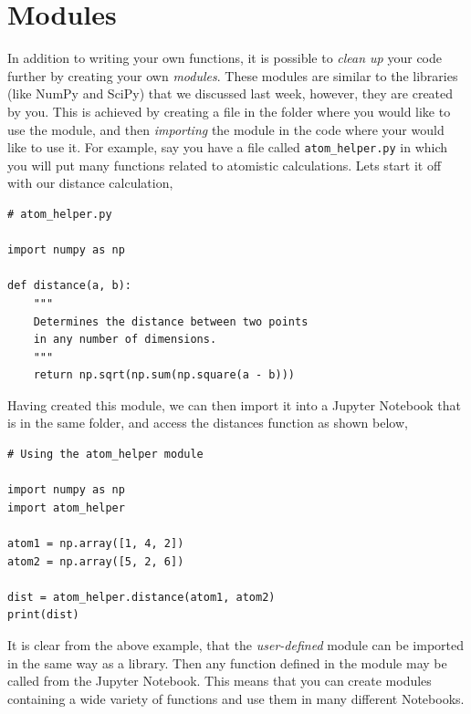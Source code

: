 \documentclass[a4paper]{article}
\begin{document}
\vspace{\baselineskip}
\begin{center}
	\noindent{}
\end{center}

\section{Modules}

In addition to writing your own functions, it is possible to \emph{clean up} your code further by creating your own \emph{modules}.
These modules are similar to the libraries (like NumPy and SciPy) that we discussed last week, however, they are created by you.
This is achieved by creating a file in the folder where you would like to use the module, and then \emph{importing} the module in the code where your would like to use it.
For example, say you have a file called \texttt{atom\_helper.py} in which you will put many functions related to atomistic calculations.
Lets start it off with our distance calculation,
\begin{lstlisting}
# atom_helper.py

import numpy as np

def distance(a, b):
    """
    Determines the distance between two points
    in any number of dimensions.
    """
    return np.sqrt(np.sum(np.square(a - b)))
\end{lstlisting}
Having created this module, we can then import it into a Jupyter Notebook that is in the same folder, and access the distances function as shown below,
\begin{lstlisting}
# Using the atom_helper module

import numpy as np
import atom_helper

atom1 = np.array([1, 4, 2])
atom2 = np.array([5, 2, 6])

dist = atom_helper.distance(atom1, atom2)
print(dist)
\end{lstlisting}
It is clear from the above example, that the \emph{user-defined} module can be imported in the same way as a library.
Then any function defined in the module may be called from the Jupyter Notebook.
This means that you can create modules containing a wide variety of functions and use them in many different Notebooks.
\end{document}

